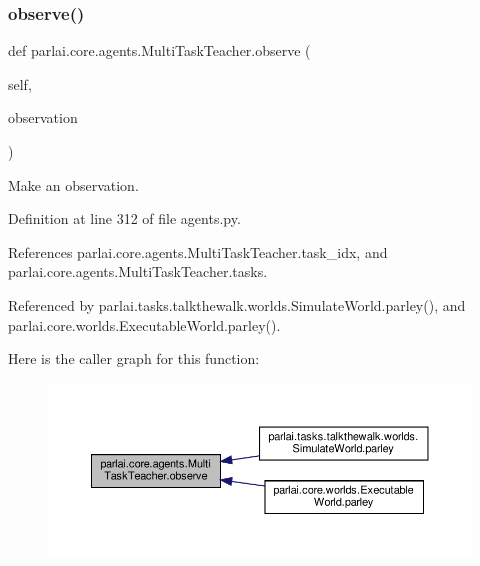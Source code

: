 \subsubsection{\texorpdfstring{observe()}{observe()}}
{\footnotesize\ttfamily def parlai.\+core.\+agents.\+Multi\+Task\+Teacher.\+observe (\begin{DoxyParamCaption}\item[{}]{self,  }\item[{}]{observation }\end{DoxyParamCaption})}

\begin{DoxyVerb}Make an observation.\end{DoxyVerb}
 

Definition at line 312 of file agents.\+py.



References parlai.\+core.\+agents.\+Multi\+Task\+Teacher.\+task\+\_\+idx, and parlai.\+core.\+agents.\+Multi\+Task\+Teacher.\+tasks.



Referenced by parlai.\+tasks.\+talkthewalk.\+worlds.\+Simulate\+World.\+parley(), and parlai.\+core.\+worlds.\+Executable\+World.\+parley().

Here is the caller graph for this function\+:
\nopagebreak
\begin{figure}[H]
\begin{center}
\leavevmode
\includegraphics[width=350pt]{classparlai_1_1core_1_1agents_1_1MultiTaskTeacher_a42290221cabd0f1ca21cb87a2228af10_icgraph}
\end{center}
\end{figure}
\mbox{\label{classparlai_1_1core_1_1agents_1_1MultiTaskTeacher_ac93a499c6438ee1b57d0ad6a702851ae}} 
